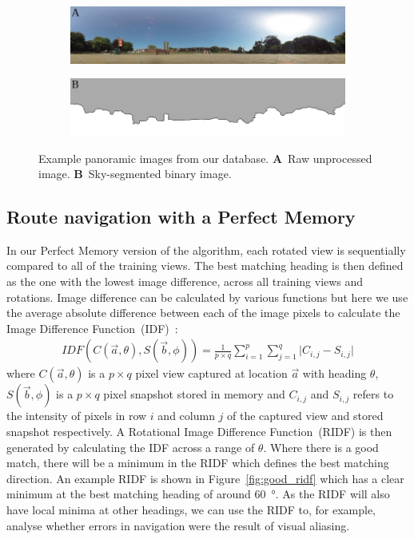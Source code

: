 \documentclass[letterpaper]{article}
\begin{document}
\begin{figure}[t]
    \centering
    \begin{subfigure}[b]{\columnwidth}
        \includegraphics[width=\columnwidth]{figures/360_240.jpg}
    \end{subfigure}
    \begin{subfigure}[b]{\columnwidth}
        \includegraphics[width=\columnwidth]{figures/360_240_mask.png}
    \end{subfigure}
    \caption{Example panoramic images from our database.
    \textbf{A}~Raw unprocessed image.
    \textbf{B}~Sky-segmented binary image.}
    \label{fig:database_images}
\end{figure}

\subsection{Route navigation with a Perfect Memory}
\label{sec:ridf_perfect_memory}
In our Perfect Memory version of the algorithm, each rotated view is sequentially compared to all of the training views. 
The best matching heading is then defined as the one with the lowest image difference, across all training views and rotations. 
Image difference can be calculated by various functions but here we use the average absolute difference between each of the image pixels to calculate the Image Difference Function~(IDF)~\citep{Zeil2003}:
%
\begin{align}
    IDF(C(\vec{a}, \theta), S(\vec{b}, \phi)) = \frac{1}{p \times q} \sum\limits_{i=1}^p{\sum\limits_{j=1}^q|{C_{i,j} - S_{i,j}|}}
\end{align}
%
where $C(\vec{a}, \theta)$ is a $p \times q$ pixel view captured at location $\vec{a}$ with heading $\theta$, $S(\vec{b}, \phi)$ is a $p \times q$ pixel snapshot stored in memory and $C_{i,j}$ and $S_{i,j}$ refers to the intensity of pixels in row $i$ and column $j$ of the captured view and stored snapshot respectively.
A Rotational Image Difference Function~(RIDF) is then generated by calculating the IDF across a range of $\theta$. 
Where there is a good match, there will be a minimum in the RIDF which defines the best matching direction. 
An example RIDF is shown in Figure~\ref{fig:good_ridf} which has a clear minimum at the best matching heading of around \SI{60}{\degree}.
As the RIDF will also have local minima at other headings, we can use the RIDF to, for example, analyse whether errors in navigation were the result of visual aliasing.
\end{document}
